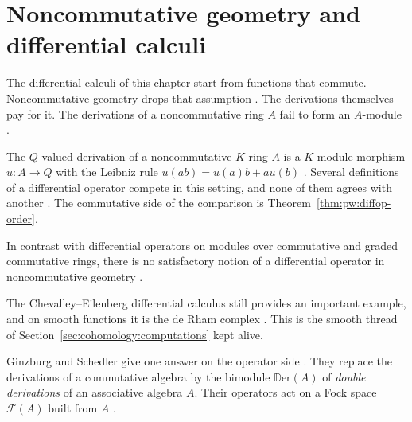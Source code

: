 \section{Noncommutative geometry and differential calculi}\label{sec:cohomology:noncommutative-geometry}

The differential calculi of this chapter start from functions that commute.
Noncommutative geometry drops that assumption \cite[Abstract,
p.~1]{Sardanashvily2007Dilemma}. The derivations themselves pay for it. The
derivations of a noncommutative ring $A$ fail to form an $A$-module
\cite[Abstract, p.~1]{Sardanashvily2007Dilemma}.

The $Q$-valued derivation of a noncommutative $K$-ring $A$ is a $K$-module
morphism $u\colon A\to Q$ with the Leibniz rule $u(ab)=u(a)b+au(b)$
\cite[p.~1]{Sardanashvily2007Dilemma}. Several definitions of a differential
operator compete in this setting, and none of them agrees with another
\cite[Abstract, p.~1]{Sardanashvily2007Dilemma}. The commutative side of the
comparison is Theorem~\ref{thm:pw:diffop-order}.

\begin{remark}
\label{rem:cohomology:ncg-dilemma}
In contrast with differential operators on modules over commutative and
graded commutative rings, there is no satisfactory notion of a
differential operator in noncommutative geometry
\cite[Abstract, p.~1]{Sardanashvily2007Dilemma}.
\end{remark}

The Chevalley--Eilenberg differential calculus still provides an important
example, and on smooth functions it is the de Rham complex
\cite[p.~1]{Sardanashvily2007Dilemma}. This is the smooth thread of
Section~\ref{sec:cohomology:computations} kept alive.

Ginzburg and Schedler give one answer on the operator side
\cite[Abstract, p.~673]{GinzburgSchedler2010BV}. They replace
the derivations of a commutative algebra by the bimodule
$\mathbb{D}\mathrm{er}(A)$ of \emph{double derivations} of an associative
algebra $A$. Their operators act on a Fock space $\mathcal{F}(A)$ built
from $A$ \cite[Abstract, p.~673]{GinzburgSchedler2010BV}.

